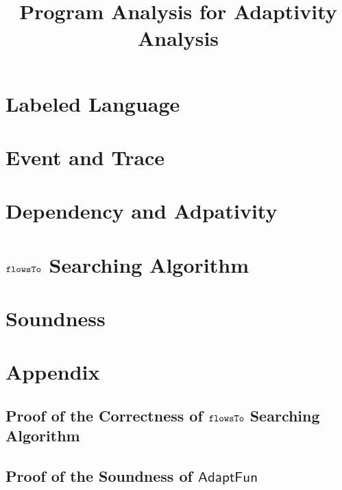 \documentclass[a4paper,11pt]{article}
\newcommand{\THESYSTEM}{\textsf{AdaptFun}}
\begin{document}
\title{Program Analysis for Adaptivity Analysis}

\author{}

\date{}

\maketitle
%
% 
\section{Labeled Language}

\clearpage
\section{Event and Trace}


\clearpage
\section{Dependency and Adpativity}


% 
\clearpage
% 

\clearpage
\section{$\mathtt{flowsTo}$ Searching Algorithm}


\section{Soundness}

\clearpage
%
\section*{Appendix}
\subsection{Proof of the Correctness of $\mathtt{flowsTo}$ Searching Algorithm}

\subsection{Proof of the Soundness of $\THESYSTEM$}




\end{document}
